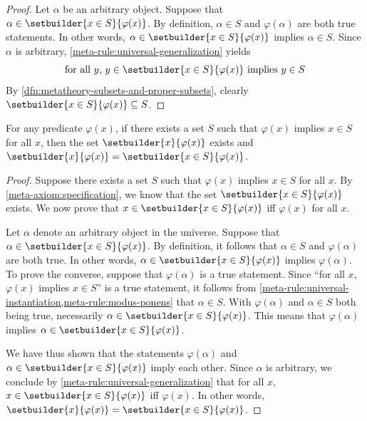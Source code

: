 \begin{proof}
    Let \( \alpha \) be an arbitrary object. Suppose that \( \alpha \in \setbuilder{x \in S}{\varphi(x)} \).
    By definition, \( \alpha \in S \) and \( \varphi(\alpha) \) are both true statements.
    In other words, \( \alpha \in \setbuilder{x \in S}{\varphi(x)} \) implies \( \alpha \in S \).
    Since \( \alpha \) is arbitrary, \cref{meta-rule:universal-generalization} yields
    \begin{equation*}
        \text{for all \( y \), \( y \in \setbuilder{x \in S}{\varphi(x)} \) implies \( y \in S \)}
    \end{equation*}
    By \cref{dfn:metatheory-subsets-and-proper-subsets}, clearly \( \setbuilder{x \in S}{\varphi(x)} \subseteq S \).
\end{proof}

\begin{thm}
     \label{thm:metatheory-existence-of-unrestricted-comprehension-set}
    For any predicate \( \varphi(x) \), if there exists a set \( S \) such that \( \varphi(x) \) implies \( x \in S \) for all \( x \),
    then the set \( \setbuilder{x}{\varphi(x)} \) exists and \( \setbuilder{x}{\varphi(x)} = \setbuilder{x \in S}{\varphi(x)} \).
\end{thm}

\begin{proof}
    Suppose there exists a set \( S \) such that \( \varphi(x) \) implies \( x \in S \) for all \( x \).
    By \cref{meta-axiom:specification}, we know that the set \( \setbuilder{x \in S}{\varphi(x)} \) exists.
    We now prove that \( x \in \setbuilder{x \in S}{\varphi(x)} \) iff \( \varphi(x) \) for all \( x \).

    \vspace{0.3cm}
    \noindent
    Let \( \alpha \) denote an arbitrary object in the universe.
    Suppose that \( \alpha \in \setbuilder{x \in S}{ \varphi(x) } \).
    By definition, it follows that \( \alpha \in S \) and \( \varphi(\alpha) \) are both true.
    In other words, \( \alpha \in \setbuilder{x \in S}{\varphi(x)} \) implies \( \varphi(\alpha) \).
    To prove the converse, suppose that \( \varphi(\alpha) \) is a true statement.
    Since ``for all \( x \), \( \varphi(x) \) implies \( x \in S \)'' is a true statement, it follows from
    \cref{meta-rule:universal-instantiation,meta-rule:modus-ponens} that \( \alpha \in S \).
    With \( \varphi(\alpha) \) and \( \alpha \in S \) both being true, necessarily \( \alpha \in \setbuilder{x \in S}{\varphi(x)} \).
    This means that \( \varphi(\alpha) \) implies \( \alpha \in \setbuilder{x \in S}{\varphi(x)} \).

    \vspace{0.3cm}
    \noindent
    We have thus shown that the statements \( \varphi(\alpha) \) and \( \alpha \in \setbuilder{x \in S}{\varphi(x)} \) imply each other.
    Since \( \alpha \) is arbitrary, we conclude by \cref{meta-rule:universal-generalization} that
    for all \( x \), \( x \in \setbuilder{x \in S}{\varphi(x)} \) iff \( \varphi(x) \).
    In other words, \( \setbuilder{x}{\varphi(x)} = \setbuilder{x \in S}{\varphi(x)} \).
\end{proof}

